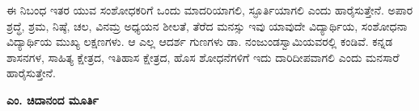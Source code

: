 ಈ ನಿಬಂಧ ಇತರ ಯುವ ಸಂಶೋಧಕರಿಗೆ ಒಂದು ಮಾದರಿಯಾಗಲಿ, ಸ್ಫೂರ್ತಿಯಾಗಲಿ ಎಂದು ಹಾರೈಸುತ್ತೇನೆ. ಅಪಾರ ಶ್ರದ್ಧೆ, ಶ್ರಮ, ನಿಷ್ಠೆ, ಚಲ, ವಿನಮ್ರ ಅಧ್ಯಯನ ಶೀಲತೆ, ತೆರೆದ ಮನಸ್ಸು ಇವು ಯಾವುದೇ ವಿದ್ಯಾರ್ಥಿಯ, ಸಂಶೋಧನಾ ವಿದ್ಯಾರ್ಥಿಯ ಮುಖ್ಯ ಲಕ್ಷಣಗಳು. ಆ ಎಲ್ಲ ಆದರ್ಶ ಗುಣಗಳು ಡಾ. ನಂಜುಂಡಸ್ವಾಮಿಯವರಲ್ಲಿ ಕಂಡಿವೆ. ಕನ್ನಡ ಶಾಸನಗಳ, ಸಾಹಿತ್ಯ ಕ್ಷೇತ್ರದ, ಇತಿಹಾಸ ಕ್ಷೇತ್ರದ, ಹೊಸ ಶೋಧನೆಗಳಿಗೆ ಇದು ದಾರಿದೀಪವಾಗಲಿ ಎಂದು ಮನಸಾರೆ ಹಾರೈಸುತ್ತೇನೆ.

\begin{flushright}
\textbf{ಎಂ. ಚಿದಾನಂದ ಮೂರ್ತಿ}
\end{flushright}

